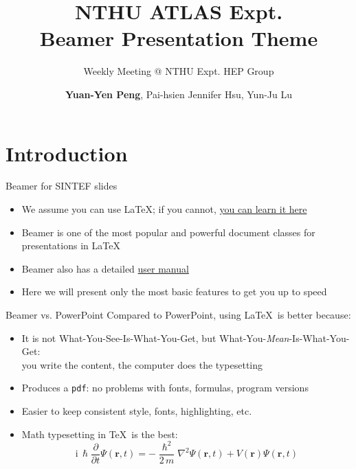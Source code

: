 \documentclass[12pt,aspectratio=43]{beamer}
\title{NTHU ATLAS Expt.\\
Beamer Presentation Theme}
\subtitle{Weekly Meeting @ NTHU Expt. HEP Group}
\author{\textbf{Yuan-Yen Peng}, Pai-hsien Jennifer Hsu, Yun-Ju Lu}
\begin{document}
\maketitle

\section{Introduction}

\begin{frame}{Beamer for SINTEF slides}{\thesection \, \secname}
    \begin{itemize}
        \item We assume you can use \LaTeX; if you cannot,
        \href{http://en.wikibooks.org/wiki/LaTeX/}{you can learn it here}
        \item Beamer is one of the most popular and powerful document
        classes for presentations in \LaTeX
        \item Beamer also has a detailed
        \href{http://www.ctan.org/tex-archive/macros/latex/contrib/beamer/doc/beameruserguide.pdf}{user manual}
        \item Here we will present only the most basic features to get you up to speed
    \end{itemize}
\end{frame}

\begin{frame}{Beamer vs. PowerPoint}
Compared to PowerPoint, using \LaTeX\ is better because:
    \begin{itemize}
        \item It is not What-You-See-Is-What-You-Get, but
        What-You-\emph{Mean}-Is-What-You-Get:\\
        you write the content, the computer does the typesetting
        \item Produces a \texttt{pdf}: no problems with fonts, formulas,
              program versions
        \item Easier to keep consistent style, fonts, highlighting, etc.
        \item Math typesetting in \TeX\ is the best:
        \begin{equation*}
            \mathrm{i}\,\hslash\frac{\partial}{\partial t} \Psi(\mathbf{r},t) =
            -\frac{\hslash^2}{2\,m}\nabla^2\Psi(\mathbf{r},t)
            + V(\mathbf{r})\Psi(\mathbf{r},t)
        \end{equation*}
    
    \end{itemize}
\end{frame}
\end{document}
